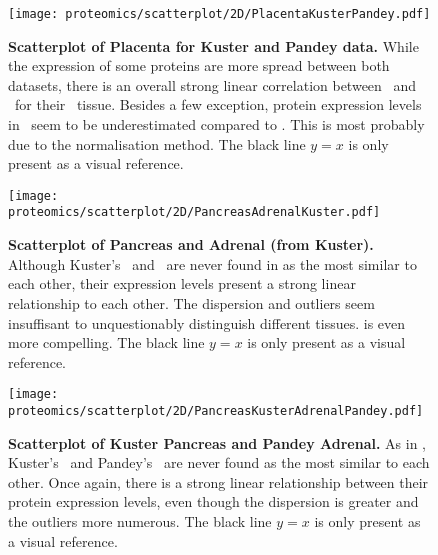 \begin{figure}[!htpb]
    \texttt{[image: proteomics/scatterplot/2D/PlacentaKusterPandey.pdf]}\centering
    \caption[Placenta: Kuster vs Pandey]{\label{fig:scat2DPlacentaKusterPandey}\textbf{%
    Scatterplot of Placenta for Kuster and Pandey data.}
    While the expression of some proteins are more spread between both datasets,
    there is an overall strong linear correlation between \pandey\ and \kuster\
    for their \placenta\ tissue.
    Besides a few exception,
    protein expression levels in \pandey\ seem to be underestimated compared to
    \kuster.
    This is most probably due to the normalisation method.
    {\small The black line $y=x$ is only present as a visual reference.}}
\end{figure}

\begin{figure}[!htpb]
    \texttt{[image: proteomics/scatterplot/2D/PancreasAdrenalKuster.pdf]}\centering
    \caption[Kuster: Pancreas vs Adrenal]{\label{fig:scat2DAdrenalPancreasKuster}\textbf{%
    Scatterplot of Pancreas and Adrenal (from Kuster).}
    Although Kuster's \Pancreas\ and \Adrenal\ are never found
    in 
    as the most similar to each other,
    their expression levels present a strong linear relationship to each other.
    The dispersion and outliers seem insuffisant
    to unquestionably distinguish different tissues.
     is even more compelling.
    {\small The black line $y=x$ is only present as a visual reference.}}
\end{figure}


\begin{figure}[!htpb]
    \texttt{[image: proteomics/scatterplot/2D/PancreasKusterAdrenalPandey.pdf]}\centering
    \caption[Kuster Pancreas vs Pandey Adrenal]{\label{fig:scat2DAdrenalPandeyPancreasKuster}\textbf{%
    Scatterplot of Kuster Pancreas and Pandey Adrenal.}
    As in ,
    Kuster's \pancreas\ and Pandey's \adrenal\ are never found as the most similar
    to each other.
    Once again,
    there is a strong linear relationship between their protein expression levels,
    even though the dispersion is greater and the outliers more numerous.
    {\small The black line $y=x$ is only present as a visual reference.}}
\end{figure}


